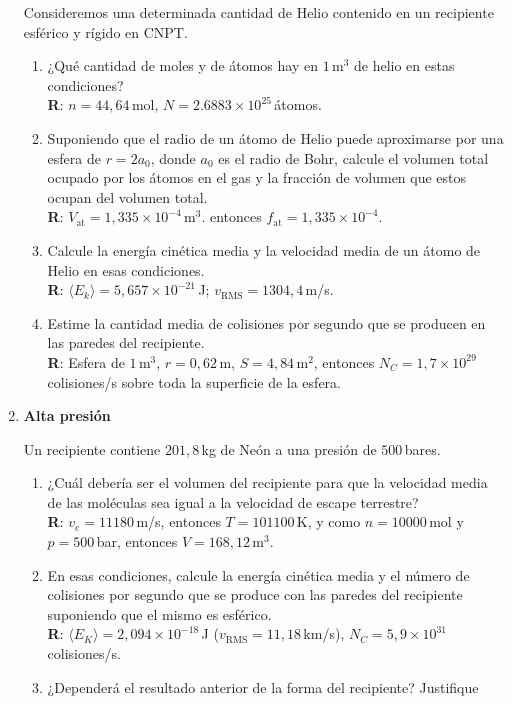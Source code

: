 \documentclass[a4paper,12pt]{article}
\begin{document}
\begin{enumerate}
		Consideremos una determinada cantidad de Helio contenido en un
		recipiente esférico y rígido en CNPT.
		\begin{enumerate}
			\item ¿Qué cantidad de moles y de átomos hay en $1$\,m$^3$ de
				helio en estas condiciones?
				\\{\bf R}: $n=44,64$\,mol, $N=2.6883\times 10^{25}$\,átomos.
			\item Suponiendo que el radio de un átomo de Helio puede
				aproximarse por una esfera de $r=2 a_0$, donde $a_0$ es el
				radio de Bohr, calcule el volumen total ocupado por los átomos
				en el gas y la fracción de volumen que estos ocupan del volumen
				total. 
				\\{\bf R}: $V_{\mathrm{at}}=1,335\times 10^{-4}$\,m$^3$.
				entonces $f_{\mathrm{at}}=1,335\times 10^{-4}$.
			\item Calcule la energía cinética media y la velocidad media de un
				átomo de Helio en esas condiciones. 
				\\{\bf R}: $\langle E_k \rangle = 5,657 \times 10^{-21}$\,J; $v_{\mathrm{RMS}}=1304,4$\,m/s.
			\item Estime la cantidad media de colisiones por segundo que se
				producen en las paredes del recipiente. 
				\\{\bf R}: Esfera de $1$\,m$^3$, $r=0,62$\,m, $S=4,84$\,m$^2$,
				entonces $N_C=1,7 \times 10^{29}$\,colisiones/s sobre toda la
				superficie de la esfera.
		\end{enumerate}
	
	\item {\bf{Alta presión}}
	
		Un recipiente contiene $201,8$\,kg de Neón a una presión de $500$\,bares. 
		\begin{enumerate}
			\item ¿Cuál debería ser el volumen del recipiente para que la
				velocidad media de las moléculas sea igual a la velocidad de
				escape terrestre? 
				\\{\bf R}: $v_e=11180$\,m/s, entonces $T=101100$\,K, y como
				$n=10000$\,mol y $p=500$\,bar, entonces $V=168,12$\,m$^3$. 
			\item En esas condiciones, calcule la energía cinética media y el
				número de colisiones por segundo que se produce con las paredes
				del recipiente suponiendo que el mismo es esférico. 
				\\{\bf R}: $\langle E_K \rangle = 2,094 \times 10^{-18}$\,J
				($v_{\mathrm{RMS}}=11,18$\,km/s), $N_C=5,9 \times
				10^{31}$\,colisiones/s.
			\item ¿Dependerá el resultado anterior de la forma del recipiente?
				Justifique
		\end{enumerate}


\end{enumerate}
\end{document}
